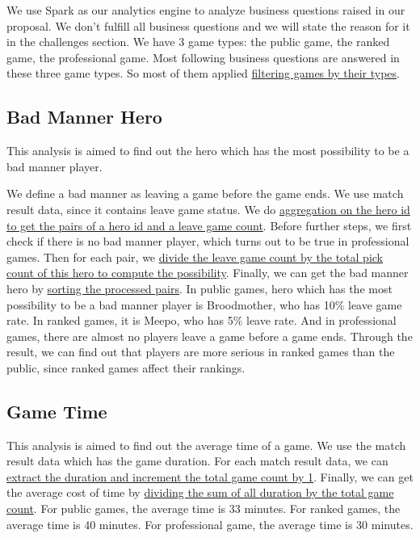\documentclass{article}
\begin{document}
We use Spark as our analytics engine to analyze business questions raised in our proposal. We don't fulfill all business questions and we will state the reason for it in the challenges section. We have 3 game types: the public game, the ranked game, the professional game. Most following business questions are answered in these three game types. So most of them applied \href{https://github.com/Vopaaz/big-data-psg-lgd/blob/master/src/main/scala/Spark/SparkMongoHelper.scala#L31-L47}{filtering games by their types}.


\subsection{Bad Manner Hero}

This analysis is aimed to find out the hero which has the most possibility to be a bad manner player.

We define a bad manner as leaving a game before the game ends. We use match result data, since it contains leave game status. We do \href{https://github.com/Vopaaz/big-data-psg-lgd/blob/master/src/main/scala/BadManner.scala#L46-L47}{aggregation on the hero id to get the pairs of a hero id and a leave game count}. Before further steps, we first check if there is no bad manner player, which turns out to be true in professional games. Then for each pair, we \href{https://github.com/Vopaaz/big-data-psg-lgd/blob/master/src/main/scala/BadManner.scala#L48}{divide the leave game count by the total pick count of this hero to compute the possibility}. Finally, we can get the bad manner hero by \href{https://github.com/Vopaaz/big-data-psg-lgd/blob/master/src/main/scala/BadManner.scala#L50}{sorting the processed pairs}. In public games, hero which has the most possibility to be a bad manner player is Broodmother, who has 10\% leave game rate. In ranked games, it is Meepo, who has 5\% leave rate. And in professional games, there are almost no players leave a game before a game ends. Through the result, we can find out that players are more serious in ranked games than the public, since ranked games affect their rankings.

\subsection{Game Time}

This analysis is aimed to find out the average time of a game. We use the match result data which has the game duration. For each match result data, we can \href{https://github.com/Vopaaz/big-data-psg-lgd/blob/master/src/main/scala/CostTime.scala#L30}{extract the duration and increment the total game count by 1}. Finally, we can get the average cost of time by \href{https://github.com/Vopaaz/big-data-psg-lgd/blob/master/src/main/scala/CostTime.scala#L31}{dividing the sum of all duration by the total game count}. For public games, the average time is 33 minutes. For ranked games, the average time is 40 minutes. For professional game, the average time is 30 minutes.
\end{document}
